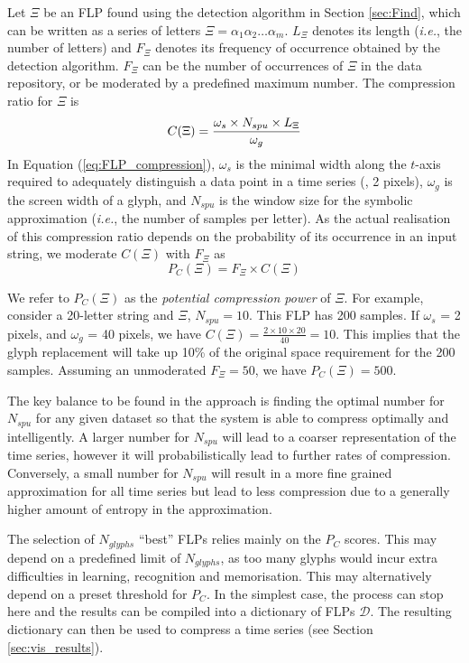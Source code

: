Let $\Xi$ be an FLP found using the detection algorithm in Section \ref{sec:Find}, which can be written as a series of letters $\Xi = \alpha_1\alpha_2\ldots\alpha_m$.
$L_{\Xi}$ denotes its length (\emph{i.e.}, the number of letters) and $F_\Xi$ denotes its frequency of occurrence obtained by the detection algorithm.
$F_\Xi$ can be the number of occurrences of $\Xi$ in the data repository, or be moderated by a predefined maximum number.
The compression ratio for $\Xi$ is
% 
\begin{equation}
	\label{eq:FLP_compression}
	C(\Xi) = \frac{\omega_s \times N_{spu} \times L_{\Xi}}{\omega_g}\\
\end{equation}
%
\noindent In Equation (\ref{eq:FLP_compression}), $\omega_s$ is the minimal width along the $t$-axis required to adequately distinguish a data point in a time series (\eg, 2 pixels), $\omega_g$ is the screen width of a glyph, and $N_{spu}$ is the window size for the symbolic approximation (\emph{i.e.}, the number of samples per letter).
As the actual realisation of this compression ratio depends on the probability of its occurrence in an input string, we moderate $C(\Xi)$ with $F_\Xi$ as
%
\begin{equation}
	\label{eq:potential_compression}
	P_C(\Xi) = F_\Xi \times C(\Xi)
\end{equation}

We refer to $P_C(\Xi)$ as the \emph{potential compression power} of $\Xi$.
For example, consider a 20-letter string and $\Xi$, $N_{spu} = 10$.
This FLP has 200 samples.
If $\omega_s$ = 2 pixels, and $\omega_g$ = 40 pixels, we have $C(\Xi) = \frac{2 \times 10 \times 20}{40} = 10$.
This implies that the glyph replacement will take up 10\% of the original space requirement for the 200 samples.
Assuming an unmoderated $F_\Xi = 50$, we have $P_C(\Xi) = 500$.

The key balance to be found in the approach is finding the optimal number for $N_{spu}$ for any given dataset so that the system is able to compress optimally and intelligently.
A larger number for $N_{spu}$ will lead to a coarser representation of the time series, however it will probabilistically lead to further rates of compression. Conversely, a small number for $N_{spu}$ will result in a more fine grained approximation for all time series but lead to less compression due to a generally higher amount of entropy in the approximation.

The selection of $N_{glyphs}$ ``best'' FLPs relies mainly on the $P_C$ scores.
This may depend on a predefined limit of $N_{glyphs}$, as too many glyphs would incur extra difficulties in learning, recognition and memorisation.
This may alternatively depend on a preset threshold for $P_C$.
In the simplest case, the process can stop here and the results can be compiled into a dictionary of FLPs $\mathcal{D}$. The resulting dictionary can then be used to compress a time series (see Section \ref{sec:vis_results}).

